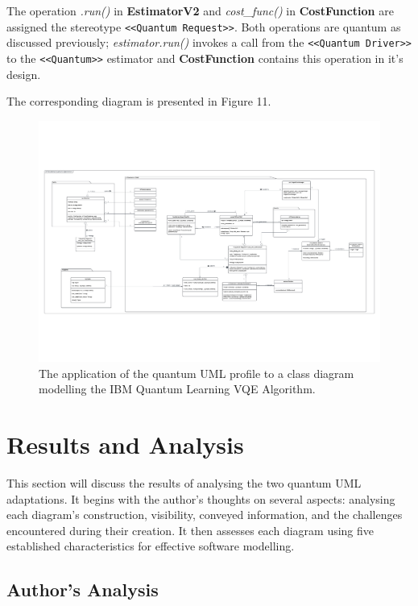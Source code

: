 \documentclass{article}
\begin{document}
The operation \textit{.run()} in \textbf{EstimatorV2} and \textit{cost\_func()} in \textbf{CostFunction} are assigned the stereotype \texttt{<<Quantum Request>>}. Both operations are quantum as discussed previously; \textit{estimator.run()} invokes a call from the \texttt{<<Quantum Driver>>} to the \texttt{<<Quantum>>} estimator and \textbf{CostFunction} contains this operation in it's design.

The corresponding diagram is presented in Figure 11.

\begin{figure}
    \centering
    \includegraphics[width=1\linewidth]{VQE UML Profile CD Final Version.pdf}
    \caption{The application of the quantum UML profile to a class diagram modelling the IBM Quantum Learning VQE Algorithm.}
    \label{fig:QUMLP_CD}
\end{figure}

\section{Results and Analysis}

This section will discuss the results of analysing the two quantum UML adaptations. It begins with the author's thoughts on several aspects: analysing each diagram's construction, visibility, conveyed information, and the challenges encountered during their creation. It then assesses each diagram using five established characteristics for effective software modelling. 

\subsection{Author's Analysis}
\end{document}

